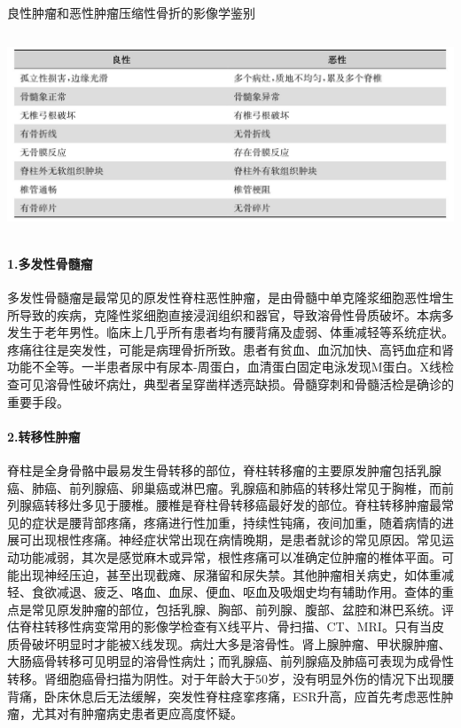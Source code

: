 \begin{table}[htbp]
\centering
\caption{良性肿瘤和恶性肿瘤压缩性骨折的影像学鉴别}
\label{tab44-4}
\includegraphics[width=6.02083in,height=2.34375in]{./images/Image00271.jpg}
\end{table}

\paragraph{1.多发性骨髓瘤}

多发性骨髓瘤是最常见的原发性脊柱恶性肿瘤，是由骨髓中单克隆浆细胞恶性增生所导致的疾病，克隆性浆细胞直接浸润组织和器官，导致溶骨性骨质破坏。本病多发生于老年男性。临床上几乎所有患者均有腰背痛及虚弱、体重减轻等系统症状。疼痛往往是突发性，可能是病理骨折所致。患者有贫血、血沉加快、高钙血症和肾功能不全等。一半患者尿中有尿本-周蛋白，血清蛋白固定电泳发现M蛋白。X线检查可见溶骨性破坏病灶，典型者呈穿凿样透亮缺损。骨髓穿刺和骨髓活检是确诊的重要手段。

\paragraph{2.转移性肿瘤}

脊柱是全身骨骼中最易发生骨转移的部位，脊柱转移瘤的主要原发肿瘤包括乳腺癌、肺癌、前列腺癌、卵巢癌或淋巴瘤。乳腺癌和肺癌的转移灶常见于胸椎，而前列腺癌转移灶多见于腰椎。腰椎是脊柱骨转移癌最好发的部位。脊柱转移肿瘤最常见的症状是腰背部疼痛，疼痛进行性加重，持续性钝痛，夜间加重，随着病情的进展可出现根性疼痛。神经症状常出现在病情晚期，是患者就诊的常见原因。常见运动功能减弱，其次是感觉麻木或异常，根性疼痛可以准确定位肿瘤的椎体平面。可能出现神经压迫，甚至出现截瘫、尿潴留和尿失禁。其他肿瘤相关病史，如体重减轻、食欲减退、疲乏、咯血、血尿、便血、呕血及吸烟史均有辅助作用。查体的重点是常见原发肿瘤的部位，包括乳腺、胸部、前列腺、腹部、盆腔和淋巴系统。评估脊柱转移性病变常用的影像学检查有X线平片、骨扫描、CT、MRI。只有当皮质骨破坏明显时才能被X线发现。病灶大多是溶骨性。肾上腺肿瘤、甲状腺肿瘤、大肠癌骨转移可见明显的溶骨性病灶；而乳腺癌、前列腺癌及肺癌可表现为成骨性转移。肾细胞癌骨扫描为阴性。对于年龄大于50岁，没有明显外伤的情况下出现腰背痛，卧床休息后无法缓解，突发性脊柱痉挛疼痛，ESR升高，应首先考虑恶性肿瘤，尤其对有肿瘤病史患者更应高度怀疑。

